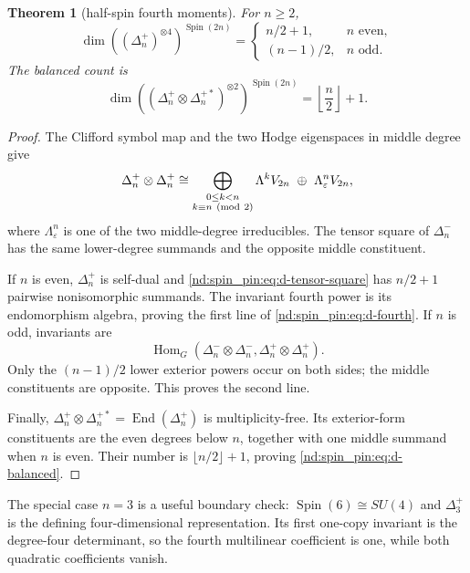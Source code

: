 \documentclass[10pt]{article}
\newcommand{\End}{\operatorname{End}}
\newcommand{\Hom}{\operatorname{Hom}}
\newtheorem{theorem}{Theorem}
\begin{document}
\begin{theorem}[half-spin fourth moments]\label{nd:spin_pin:thm:d-fourth}
For $n\ge2$,
\begin{equation}\label{nd:spin_pin:eq:d-fourth}
 \boxed{\dim((\Delta_n^+)^{\otimes4})^{\operatorname{Spin}(2n)}
 =\begin{cases}
 n/2+1,&n\text{ even},\\[2pt]
 (n-1)/2,&n\text{ odd}.
 \end{cases}}
\end{equation}
The balanced count is
\begin{equation}\label{nd:spin_pin:eq:d-balanced}
 \boxed{\dim\left((\Delta_n^+\otimes\Delta_n^{+*})^{\otimes2}
 \right)^{\operatorname{Spin}(2n)}=\left\lfloor\frac n2\right\rfloor+1.}
\end{equation}
\end{theorem}

\begin{proof}
The Clifford symbol map and the two Hodge eigenspaces in middle degree give
\begin{equation}\label{nd:spin_pin:eq:d-tensor-square}
 \Delta_n^+\otimes\Delta_n^+
 \cong
 \bigoplus_{\substack{0\le k<n\\k\equiv n\ ({\rm mod}\ 2)}}
 \Lambda^kV_{2n}\ \oplus\ \Lambda^n_{\varepsilon}V_{2n},
\end{equation}
where $\Lambda^n_{\varepsilon}$ is one of the two middle-degree irreducibles.
The tensor square of $\Delta_n^-$ has the same lower-degree summands and the
opposite middle constituent.

If $n$ is even, $\Delta_n^+$ is self-dual and
\eqref{nd:spin_pin:eq:d-tensor-square} has $n/2+1$ pairwise nonisomorphic summands.
The invariant fourth power is its endomorphism algebra, proving the first
line of \eqref{nd:spin_pin:eq:d-fourth}.  If $n$ is odd, invariants are
\[
 \Hom_G(\Delta_n^-\otimes\Delta_n^-,
         \Delta_n^+\otimes\Delta_n^+).
\]
Only the $(n-1)/2$ lower exterior powers occur on both sides; the middle
constituents are opposite.  This proves the second line.

Finally, $\Delta_n^+\otimes\Delta_n^{+*}=\End(\Delta_n^+)$ is
multiplicity-free.  Its exterior-form constituents are the even degrees below
$n$, together with one middle summand when $n$ is even.  Their number is
$\lfloor n/2\rfloor+1$, proving \eqref{nd:spin_pin:eq:d-balanced}.
\end{proof}

The special case $n=3$ is a useful boundary check:
$\operatorname{Spin}(6)\cong SU(4)$ and $\Delta_3^+$ is the defining
four-dimensional representation.  Its first one-copy invariant is the
degree-four determinant, so the fourth multilinear coefficient is one, while
both quadratic coefficients vanish.
\end{document}
